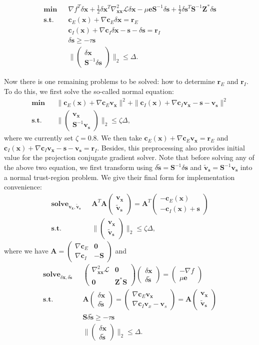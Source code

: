 \documentclass[annual]{acmsiggraph}
\newcommand{\E}[1]{\mathbf{#1}}
\newcommand{\TWOC}[2]{\left(\begin{array}{c}#1 \\ #2\end{array}\right)}
\newcommand{\TWORC}[4]{\left(\begin{array}{cc}#1 & #2 \\ #3 & #4\end{array}\right)}
\begin{document}
\begin{eqnarray*}
\E{min}&&\nabla f^T\delta\E{x}+\frac{1}{2}\delta\E{x}^T\nabla^2_{\E{x}\E{x}}\mathcal{L}\delta\E{x}-\mu\E{e}\E{S}^{-1}\delta\E{s}+\frac{1}{2}\delta\E{s}^T\E{S}^{-1}\E{Z}^*\delta\E{s}	\\
\E{s.t.}&&\E{c}_E(\E{x})+\nabla\E{c}_E\delta\E{x}=\E{r}_E\\
&&\E{c}_I(\E{x})+\nabla\E{c}_I\delta\E{x}-\E{s}-\delta\E{s}=\E{r}_I	\\
&&\delta\E{s} \geq -\tau\E{s}	\\
&&\|\TWOC{\delta\E{x}}{\E{S}^{-1}\delta\E{s}}\|_2\leq\Delta.
\end{eqnarray*}

Now there is one remaining problems to be solved: how to determine $\E{r}_E$ and $\E{r}_I$. To do this, we first solve the so-called normal equation:
\begin{eqnarray*}
\E{min}&&\|\E{c}_E(\E{x})+\nabla\E{c}_E\E{v}_\E{x}\|^2+\|\E{c}_I(\E{x})+\nabla\E{c}_I\E{v}_\E{x}-\E{s}-\E{v}_\E{s}\|^2	\\
\E{s.t.}&&\|\TWOC{\E{v}_\E{x}}{\E{S}^{-1}\E{v}_\E{s}}\|_2\leq\zeta\Delta,
\end{eqnarray*}
where we currently set $\zeta=0.8$. We then take $\E{c}_E(\E{x})+\nabla\E{c}_E\E{v}_\E{x}=\E{r}_E$ and $\E{c}_I(\E{x})+\nabla\E{c}_I\E{v}_\E{x}-\E{s}-\E{v}_\E{s}=\E{r}_I$. Besides, this preprocessing also provides initial value for the projection conjugate gradient solver. Note that before solving any of the above two equation, we first transform using $\delta\tilde{\E{s}}=\E{S}^{-1}\delta\E{s}$ and $\tilde{\E{v}}_\E{s}=\E{S}^{-1}\E{v}_\E{s}$ into a normal trust-region problem. We give their final form for implementation convenience:
\begin{subequations}
\label{pb:NORMAL}
\begin{align}
\E{solve}_{\E{v}_\E{x}, \tilde{\E{v}}_\E{s}}\text{ }&\E{A}^T\E{A}\TWOC{\E{v}_\E{x}}{\tilde{\E{v}}_\E{s}}=\E{A}^T\TWOC{-\E{c}_E(\E{x})}{-\E{c}_I(\E{x})+\E{s}}	\\
\E{s.t.}\text{ }&\|\TWOC{\E{v}_\E{x}}{\tilde{\E{v}}_\E{s}}\|_2\leq\zeta\Delta,
\end{align}
\end{subequations}
where we have $\E{A}=\TWORC{\nabla \E{c}_E}{\E{0}}{\nabla\E{c}_I}{-\E{S}}$ and
\begin{subequations}
\label{pb:QP}
\begin{align}
\E{solve}_{\delta\E{x}, \delta\tilde{\E{s}}}\text{ }&\TWORC{\nabla^2_{\E{x}\E{x}}\mathcal{L}}{\E{0}}{\E{0}}{\E{Z}^*\E{S}}\TWOC{\delta\E{x}}{\delta\tilde{\E{s}}}=\TWOC{-\nabla f}{\mu\E{e}}	\\
\E{s.t.}\text{ }&\E{A}\TWOC{\delta\E{x}}{\delta\tilde{\E{s}}}=\TWOC{\nabla \E{c}_E\E{v}_\E{x}}{\nabla\E{c}_I\E{v}_x-\E{v}_s}=\E{A}\TWOC{\E{v}_\E{x}}{\tilde{\E{v}}_\E{s}}	\\
\text{ }&\E{S}\delta\tilde{\E{s}} \geq -\tau\E{s}	\\
\text{ }&\|\TWOC{\delta\E{x}}{\delta\tilde{\E{s}}}\|_2\leq\Delta.
\end{align}
\end{subequations}
\end{document}
